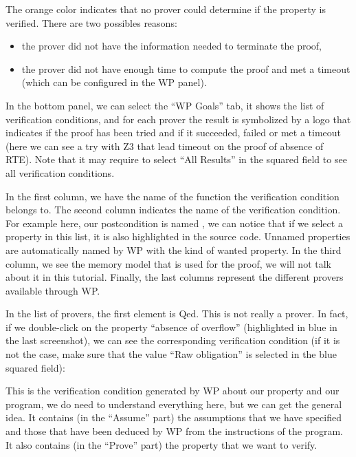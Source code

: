 The orange color indicates that no prover could determine if the
property is verified. There are two possibles reasons:



\begin{itemize}
\item the prover did not have the information needed to terminate the proof,
\item the prover did not have enough time to compute the proof and
  met a timeout (which can be configured in the WP panel).
\end{itemize}


In the bottom panel, we can select the ``WP Goals'' tab, it shows the list of
verification conditions, and for each prover the result is symbolized
by a logo that indicates if the proof has been tried and if it
succeeded, failed or met a timeout (here we can see a try with
Z3 that lead timeout on the proof of absence of RTE). Note that it
may require to select ``All Results'' in the squared field to see all
verification conditions.




In the first column, we have the name of the function the verification
condition belongs to. The second column indicates the name of the verification
condition. For example here, our postcondition is named
, we can notice
that if we select a property in this list, it is also highlighted in the
source code. Unnamed properties are automatically named by WP with the
kind of wanted property. In the third column, we see the memory model
that is used for the proof, we will not talk about it in this tutorial.
Finally, the last columns represent the different provers available
through WP.



In the list of provers, the first element is Qed. This is not really a prover.
In fact, if we double-click on the property ``absence of overflow''
(highlighted in blue in the last screenshot), we can see the corresponding
verification condition (if it is not the case, make sure that the value ``Raw
obligation'' is selected in the blue squared field):





This is the verification condition generated by WP about our property and our
program, we do need to understand everything here, but we can get the
general idea. It contains (in the ``Assume'' part) the assumptions that
we have specified and those that have been deduced by WP from the
instructions of the program. It also contains (in the ``Prove'' part)
the property that we want to verify.



